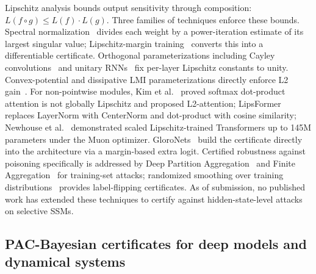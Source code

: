 \documentclass[12pt,a4paper]{article}
\theoremstyle{definition}
\theoremstyle{remark}
\begin{document}
Lipschitz analysis bounds output sensitivity through composition: $L(f \circ g) \leq L(f) \cdot L(g)$. Three families of techniques enforce these bounds. Spectral normalization~\cite{miyato2018spectral} divides each weight by a power-iteration estimate of its largest singular value; Lipschitz-margin training~\cite{tsuzuku2018margin} converts this into a differentiable certificate. Orthogonal parameterizations including Cayley convolutions~\cite{trockman2021cayley} and unitary RNNs~\cite{arjovsky2016unitary} fix per-layer Lipschitz constants to unity. Convex-potential and dissipative LMI parameterizations directly enforce L2 gain~\cite{pauli2024lipkernel,massai2025l2ru}. For non-pointwise modules, Kim et al.~\cite{kim2021lipschitz} proved softmax dot-product attention is not globally Lipschitz and proposed L2-attention; LipsFormer~\cite{qi2023lipsformer} replaces LayerNorm with CenterNorm and dot-product with cosine similarity; Newhouse et al.~\cite{newhouse2025lipschitz} demonstrated scaled Lipschitz-trained Transformers up to 145M parameters under the Muon optimizer. GloroNets~\cite{leino2021globally} build the certificate directly into the architecture via a margin-based extra logit. Certified robustness against poisoning specifically is addressed by Deep Partition Aggregation~\cite{levine2021deep} and Finite Aggregation~\cite{wang2022certified} for training-set attacks; randomized smoothing over training distributions~\cite{rosenfeld2020certified} provides label-flipping certificates. As of submission, no published work has extended these techniques to certify against hidden-state-level attacks on selective SSMs.

\subsection{PAC-Bayesian certificates for deep models and dynamical systems}
\end{document}
